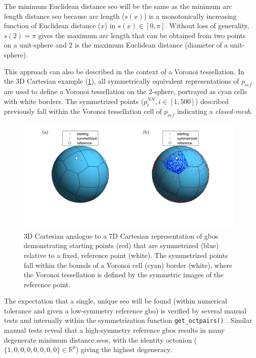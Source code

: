 \documentclass[preprint,12pt]{elsarticle}
\begin{document}
The minimum Euclidean distance \gls{seo} will be the same as the minimum arc length distance \gls{seo} because arc length ($s(x)$) is a monotonically increasing function of Euclidean distance ($x$) in $s(x)\in[0,\pi]$. Without loss of generality, $s(2)=\pi$ gives the maximum arc length that can be obtained from two points on a unit-sphere and $2$ is the maximum Euclidean distance (diameter of a unit-sphere).

This approach can also be described in the context of a Voronoi tessellation. In the 3D Cartesian example (\cref{fig:voronoi}), all symmetrically equivalent representations of $p_{ref}$ are used to define a Voronoi tessellation on the 2-sphere, portrayed as cyan cells with white borders. The symmetrized points ($p^{NN}_i,i\in[1,500]$) described previously fall within the Voronoi tessellation cell of $p_{ref}$ indicating a \textit{closed-mesh}.

\begin{figure}
    \centering
    \includegraphics{voronoi.png}
    \caption{3D Cartesian analogue to a 7D Cartesian representation of \glspl{gbo} demonstrating starting points (red) that are symmetrized (blue) relative to a fixed, reference point (white). The symmetrized points fall within the bounds of a Voronoi cell (cyan) border (white), where the Voronoi tessellation is defined by the symmetric images of the reference point.}
    \label{fig:voronoi}
\end{figure}

The expectation that a single, unique \gls{seo} will be found (within numerical tolerance and given a low-symmetry reference \gls{gbo}) is verified by several manual tests and internally within the symmetrization function \texttt{get\_octpairs()} \cite{bairdFiveDegreeofFreedom5DOF2020}. Similar manual tests reveal that a high-symmetry reference \glspl{gbo} results in many degenerate minimum distance \glspl{seo}, with the identity octonion ($\{1,0,0,0,0,0,0,0\}\in\mathbb{R}^8$) \cite{francisGeodesicOctonionMetric2019} giving the highest degeneracy.
\end{document}
